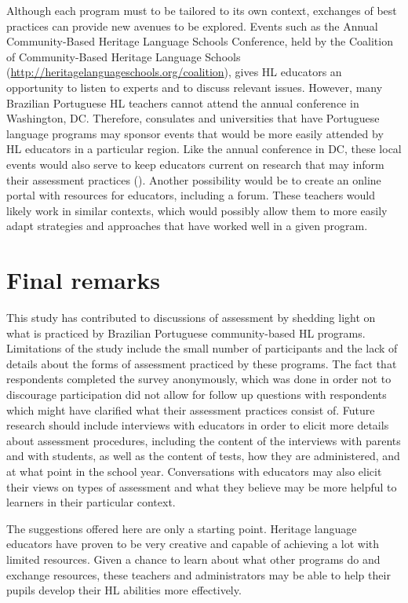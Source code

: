 \documentclass[output=paper]{langscibook}
\begin{document}
\begin{sloppypar}
Although each program must to be tailored to its own context, exchanges of best practices can provide new avenues to be explored. Events such as the Annual Community-Based Heritage Language Schools Conference, held by the Coalition of Community-Based Heritage Language Schools (\url{http://heritagelanguageschools.org/coalition}), gives HL educators an opportunity to listen to experts and to discuss relevant issues. However, many Brazilian Portuguese HL teachers cannot attend the annual conference in Washington, DC. Therefore, consulates and universities that have Portuguese language programs may sponsor events that would be more easily attended by HL educators in a particular region. Like the annual conference in DC, these local events would also serve to keep educators current on research that may inform their assessment practices (\citealt{IlievaClark-Gareca2016}). Another possibility would be to create an online portal with resources for educators, including a forum. These teachers would likely work in similar contexts, which would possibly allow them to more easily adapt strategies and approaches that have worked well in a given program.
\end{sloppypar}

\section{Final remarks}\label{sec:6:7}

This study has contributed to discussions of assessment by shedding light on what is practiced by Brazilian Portuguese community-based HL programs. Limitations of the study include the small number of participants and the lack of details about the forms of assessment practiced by these programs. The fact that respondents completed the survey anonymously, which was done in order not to discourage participation did not allow for follow up questions with respondents which might have clarified what their assessment practices consist of. Future research should include interviews with educators in order to elicit more details about assessment procedures, including the content of the interviews with parents and with students, as well as the content of tests, how they are administered, and at what point in the school year. Conversations with educators may also elicit their views on types of assessment and what they believe may be more helpful to learners in their particular context.

The suggestions offered here are only a starting point. Heritage language educators have proven to be very creative and capable of achieving a lot with limited resources. Given a chance to learn about what other programs do and exchange resources, these teachers and administrators may be able to help their pupils develop their HL abilities more effectively.
\end{document}
